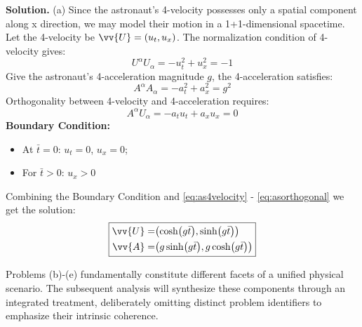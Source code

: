 \documentclass[12pt, a4paper, oneside]{article}
\newenvironment{solution}{\par\noindent\textbf{Solution. }}{\par}
\begin{document}
\begin{solution}
    (a) Since the astronaut's 4-velocity possesses only a spatial component along x direction, we may model their motion in a 1+1-dimensional spacetime. Let the 4-velocity be $\vv{U}=\qty(u_t, u_x)$. The normalization condition of 4-velocity gives:
    \begin{equation}
        U^\alpha U_\alpha = -u_t^2 + u_x^2 = -1\label{eq:as4velocity}
    \end{equation}
    Give the astronaut's 4-acceleration magnitude $g$, the 4-acceleration satisfies:
    \begin{equation}
        A^\alpha A_\alpha = -a_t^2 + a_x^2 = g^2\label{eq:as4acceleration}
    \end{equation}
    Orthogonality between 4-velocity and 4-acceleration requires:
    \begin{equation}
        A^\alpha U_\alpha = -a_t u_t + a_x u_x = 0\label{eq:asorthogonal}
    \end{equation}
    \textbf{Boundary Condition:}
    \begin{itemize}
        \item At $\bar{t}=0$: $u_t=0$, $u_x=0$;
        \item For $\bar{t}>0$: $u_x>0$
    \end{itemize}
    Combining the Boundary Condition and \cref{eq:as4velocity} - \cref{eq:asorthogonal} we get the solution:
    \begin{align}
        \boxed{
            \begin{aligned}
                \vv{U} =& \qty(\cosh (g\bar{t}), \sinh (g\bar{t}))\\
                \vv{A} =& \qty(g\sinh (g\bar{t}), g\cosh (g\bar{t}))
            \end{aligned}
        }\label{eq:asmotion}
    \end{align}

    Problems (b)-(e) fundamentally constitute different facets of a unified physical scenario. The subsequent analysis will synthesize these components through an integrated treatment, deliberately omitting distinct problem identifiers to emphasize their intrinsic coherence.


\end{solution}
\end{document}
